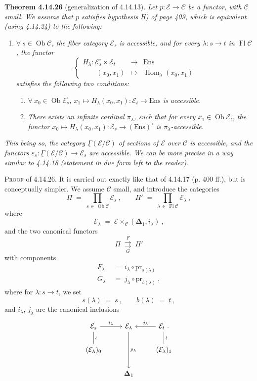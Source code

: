 \documentclass[11pt]{article}
\newcommand{\msp}[1]{\marginpar{\footnotesize [#1]}}
\newcommand{\cE}{\mathcal{E}}
\newcommand{\cC}{\mathcal{C}}
\newcommand{\Ob}{\operatorname{Ob}}
\newcommand{\Fl}{\operatorname{Fl}}
\newcommand{\Hom}{\operatorname{Hom}}
\newcommand{\Ens}{\mathrm{Ens}}
\newcommand{\pr}{\mathrm{pr}}
\begin{document}
\msp{page 422}
\textbf{Theorem 4.14.26} (generalization of 4.14.13). \textit{Let $p : \cE \longrightarrow \cC$ be a functor, with $\cC$ small. We assume that $p$ satisfies hypothesis H) of page 409, which is equivalent (using 4.14.24) to the following:}
\begin{enumerate}
\item[\textit{H$'$)}] \textit{$\forall\ s \in \Ob\cC$, the fiber category $\cE_s$ is accessible, and for every $\lambda : s \longrightarrow t$ in $\Fl\cC$, the functor}
\[
\left\{
\begin{array}{lcl}
H_\lambda : \cE_s^\circ \times \cE_t & \longrightarrow & \Ens\\[1ex]
\qquad (x_0,x_1) & \longmapsto & \Hom_\lambda(x_0,x_1)
\end{array}
\right.
\]
\textit{satisfies the following two conditions:}
\begin{enumerate}
\item[\textit{a)}] \textit{$\forall\ x_0 \in \Ob\cE_s^\circ$, $x_1 \longmapsto H_\lambda(x_0,x_1) : \cE_t \longrightarrow \Ens$ is accessible.}
\item[\textit{b)}] \textit{There exists an infinite cardinal $\pi_\lambda$, such that for every $x_1 \in \Ob\cE_t$, the functor $x_0 \longmapsto H_\lambda(x_0,x_1) : \cE_s \longrightarrow (\Ens)^\circ$ is $\pi_\lambda$-accessible.}
\end{enumerate}
\end{enumerate}
\textit{This being so, the category $\underline{\Gamma}(\cE/\cC)$ of sections of $\cE$ over $\cC$ is accessible, and the functors $\varepsilon_s : \underline{\Gamma}(\cE/\cC) \longrightarrow \cE_s$ are accessible. We can be more precise in a way similar to 4.14.18 (statement in due form left to the reader).}

\msp{page 423}
\textsc{Proof} of 4.14.26. It is carried out exactly like that of 4.14.17 (p. 400 ff.), but is conceptually simpler. We assume $\cC$ small, and introduce the categories
\[
\Pi \;=\; \prod_{s\,\in\,\Ob\cC} \cE_s\ , \qquad \Pi' \;=\; \prod_{\lambda\,\in\,\Fl\cC} \cE_\lambda\ ,
\]
where
\[
\cE_\lambda \;=\; \cE \times_{\cC} (\boldsymbol{\Delta}_1, i_\lambda)\ ,
\]
and the two canonical functors
\[
\Pi \;\underset{G}{\overset{F}{\rightrightarrows}}\; \Pi'
\]
with components
\[
\begin{aligned}
F_\lambda \;&=\; i_\lambda \circ \pr_{s(\lambda)}\\
G_\lambda \;&=\; j_\lambda \circ \pr_{b(\lambda)}\ ,
\end{aligned}
\]
where for $\lambda : s \longrightarrow t$, we set
\[
s(\lambda) \;=\; s\ , \qquad b(\lambda) \;=\; t\ ,
\]
and $i_\lambda$, $j_\lambda$ are the canonical inclusions
\[
\begin{tikzcd}
\cE_s \arrow[r,"i_\lambda"] \arrow[d,dash,"\wr"] & \cE_\lambda \arrow[dd,"p_\lambda"] & \cE_t\ . \arrow[l,"j_\lambda"'] \arrow[d,dash,"\wr"] \\
(\cE_\lambda)_0 & & (\cE_\lambda)_1 \\
& \boldsymbol{\Delta}_1 &
\end{tikzcd}
\]
\end{document}
